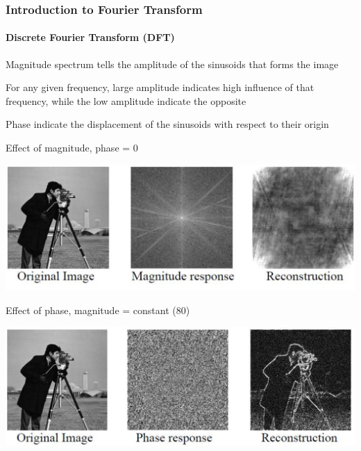 \documentclass{beamer}
\begin{document}
\begin{frame}
\frametitle{Introduction to Fourier Transform}
\framesubtitle{Discrete Fourier Transform (DFT)}
\begin{itemize}
\scriptsize{
	\item Magnitude spectrum tells the amplitude of the sinusoids that forms the image
	\item For any given frequency, large amplitude indicates high influence of that frequency, while the low amplitude indicate the opposite 
	\item Phase indicate the displacement of the sinusoids with respect to their origin 
	\item Effect of magnitude, phase = 0 }
	\begin{center}
	\includegraphics[scale=0.15]{images/F1_MagnitudePhase1.png}
	\end{center}
	\item \scriptsize{Effect of phase, magnitude = constant (80)}
	\begin{center}
	\includegraphics[scale=0.15]{images/F1_MagnitudePhase2.png}
	\end{center}	
\end{itemize}
\end{frame}
\end{document}
